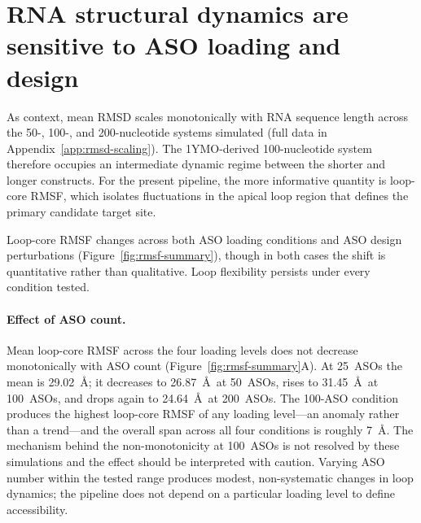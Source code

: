 \section{RNA structural dynamics are sensitive to ASO loading and design}
\label{sec:results-dynamics}

As context, mean RMSD scales monotonically with RNA sequence length across the
50-, 100-, and 200-nucleotide systems simulated (full data in
Appendix~\ref{app:rmsd-scaling}).
The 1YMO-derived 100-nucleotide system therefore occupies an intermediate
dynamic regime between the shorter and longer constructs.
For the present pipeline, the more informative quantity is loop-core RMSF,
which isolates fluctuations in the apical loop region that defines the
primary candidate target site.

Loop-core RMSF changes across both ASO loading conditions and ASO design
perturbations (Figure~\ref{fig:rmsf-summary}), though in both cases the
shift is quantitative rather than qualitative.
Loop flexibility persists under every condition tested.

\paragraph{Effect of ASO count.}
Mean loop-core RMSF across the four loading levels does not decrease
monotonically with ASO count
(Figure~\ref{fig:rmsf-summary}A).
At 25~ASOs the mean is 29.02~\AA;
it decreases to 26.87~\AA\ at 50~ASOs, rises to 31.45~\AA\ at 100~ASOs,
and drops again to 24.64~\AA\ at 200~ASOs.
The 100-ASO condition produces the highest loop-core RMSF of any loading
level---an anomaly rather than a trend---and the overall span across all four
conditions is roughly 7~\AA.
The mechanism behind the non-monotonicity at 100~ASOs is not resolved by
these simulations and the effect should be interpreted with caution.
Varying ASO number within the tested range produces modest, non-systematic
changes in loop dynamics; the pipeline does not depend on a particular
loading level to define accessibility.

